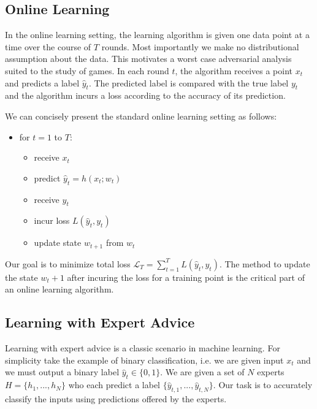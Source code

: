 \documentclass{article}
\begin{document}
\subsection{Online Learning}

In the online learning setting, the learning algorithm is given one data point at a time over the course of $T$ rounds. Most importantly we make no distributional assumption about the data. This motivates a worst case adversarial analysis suited to the study of games. In each round $t$, the algorithm receives a point $x_t$ and predicts a label $\hat y_t$. The predicted label is compared with the true label $y_t$ and the algorithm incurs a loss according to the accuracy of its prediction.

We can concisely present the standard online learning setting as follows:

\begin{itemize}
\item for $t = 1$ to $T$:
    \begin{itemize}
    \item receive $x_t$
    \item predict $\hat{y}_t = h(x_t; w_t)$
    \item receive $y_t$
    \item incur loss $L(\hat{y}_t, y_t)$
    \item update state $w_{t+1}$ from $w_t$
    \end{itemize}
\end{itemize}

Our goal is to minimize total loss $\mathcal{L}_T = \sum_{t=1}^T L(\hat{y}_t,y_t)$. The method to update the state $w_t+1$ after incuring the loss for a training point is the critical part of an online learning algorithm. 

\subsection{Learning with Expert Advice}

Learning with expert advice is a classic scenario in machine learning. For simplicity take the example of binary classification, i.e. we are given input ${x_t}$ and we must output a binary label $\hat{y}_t \in \lbrace 0,1 \rbrace$. We are given a set of $N$ experts $H = \lbrace h_1,...,h_N \rbrace $ who each predict a label $\lbrace \hat y_{t,1},...,\hat y_{t,N} \rbrace$. Our task is to accurately classify the inputs using predictions offered by the experts.
\end{document}
